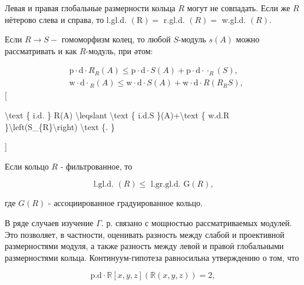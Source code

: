 \documentclass[10pt]{article}
\begin{document}
Левая и правая глобальные размерности кольца $R$ могут не совпадать. Если же $R$ нётерово слева и справа, то l.gl.d. $(\mathrm{R})=$ r.gl.d. $(R)=$ w.gl.d. $(R)$.



Если $R \rightarrow S-$ гомоморфизм колец, то любой $S$-модуль $s(A)$ можно рассматривать и как $R$-модуль, при әтом:



\[

\begin{aligned}

& \mathrm{p} \cdot \mathrm{d} \cdot R_{R}(A) \leqslant \mathrm{p} \cdot \mathrm{d} \cdot S(A)+\mathrm{p} \cdot \mathrm{d} \cdot \cdot_{R}(S), \\

& \mathrm{w} \cdot \mathrm{d} \cdot{ }_{R}(A) \leqslant \mathrm{w} \cdot \mathrm{d} \cdot S(A)+\mathrm{w} \cdot \mathrm{d} \cdot R\left(R_{R} S\right),

\end{aligned}

\][



\textbackslash text \{ i.d. \} R(A) \textbackslash leqslant \textbackslash text \{ i.d.S \}(A)+\textbackslash text \{ w.d.R \}\textbackslash left(S\_\{R\}\textbackslash right) \textbackslash text \{. \}

]



Если кольцо $R$ - фильтрованное, то



\[

\text { l.gl.d. }(R) \leqslant \text { l.gr.gl.d. } \mathrm{G}(R) \text {, }

\]



где $G(R)$ - ассоциированное градуированное кольцо.



В ряде случаев изучение $\Gamma$. р. связано с мощностью рассматриваемых модулей. Это позволяет, в частности, оценивать разность между слабой и проективной размерностями модуля, а также разность между левой и правоӥ глобальными размерностями кольца. Континуум-гипотеза равносильна утверждению о том, что



\[

\mathrm{p} . \mathrm{d} \cdot \mathbb{R}[x, y, z](\mathbb{R}(x, y, z))=2,

\]
\end{document}
